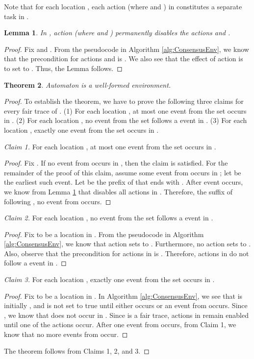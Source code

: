 \documentclass[11pt]{article}
\newtheorem{theorem}{Theorem}
\numberwithin{theorem}{section}
\newtheorem{lemma}[theorem]{Lemma}
\begin{document}
Note that for each location , each action  (where  and ) in  constitutes a separate task  in .

\begin{lemma}\label{prop:proposeDisables}
 In , action  (where  and ) permanently disables the actions  and .
\end{lemma}
\begin{proof}
 Fix  and . From the pseudocode in Algorithm \ref{alg:ConsensusEnv}, we know that the precondition for actions  and  is . We also see that the effect of action  is to set  to . Thus, the Lemma follows.
\end{proof}

\begin{theorem}\label{thm:environmentWellFormed}
 Automaton  is a well-formed environment.
\end{theorem}
\begin{proof}
 To establish the theorem, we have to prove the following three claims for every fair trace  of . (1) For each location , at most one event from the set  occurs in . (2) For each location , no event from the set  follows a  event in . (3) For each location , exactly one event from the set  occurs in .
 
 \textit{Claim 1.} For each location , at most one event from the set  occurs in .
 \begin{proof}
 Fix .
 If no event from  occurs in , then the claim is satisfied. For the remainder of the proof of this claim, assume some event from  occurs in ; let  be the earliest such event. Let  be the prefix of  that ends with . After event  occurs, we know from Lemma \ref{prop:proposeDisables} that  disables all actions in  . Therefore, the suffix of  following , no event from  occurs.
 \end{proof}
 
 \textit{Claim 2.} For each location , no event from the set  follows a  event in .
 \begin{proof}
 Fix  to be a location in . From the pseudocode in Algorithm \ref{alg:ConsensusEnv}, we know that action  sets  to . Furthermore, no action sets  to . Also, observe that the precondition for actions in   is . Therefore, actions in  do not follow a  event in .
 \end{proof}
 
 \textit{Claim 3.}
 For each location , exactly one event from the set  occurs in .
 
 \begin{proof}
 Fix  to be a location in .  In Algorithm \ref{alg:ConsensusEnv}, we see that  is initially , and is not set to true until either  occurs or an event from  occurs. Since , we know that  does not occur in .
 Since  is a fair trace, actions in  remain enabled until one of the actions occur. After one event from  occurs, from Claim 1, we know that no more events from  occur.
 \end{proof}
 
 The theorem follows from Claims 1, 2, and 3.
\end{proof}
\end{document}
